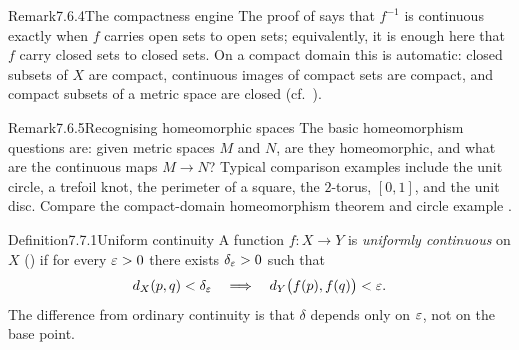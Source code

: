 \documentclass[main.tex]{subfiles}
\begin{document}
\begin{ObjL}{Remark}{7.6.4}{The compactness engine}
The proof of  says that $f^{-1}$ is continuous exactly when $f$ carries open sets to
open sets; equivalently, it is enough here that $f$ carry closed sets to closed sets. On a compact
domain this is automatic: closed subsets of $X$ are compact, continuous images of compact sets are
compact, and compact subsets of a metric space are closed (cf.\ ).
\end{ObjL}

\begin{ObjL}{Remark}{7.6.5}{Recognising homeomorphic spaces}
The basic homeomorphism questions are: given metric spaces $M$ and $N$, are they homeomorphic, and
what are the continuous maps $M\to N$? Typical comparison examples include the unit circle, a
trefoil knot, the perimeter of a square, the $2$-torus, $[0,1]$, and the unit disc. Compare the
compact-domain homeomorphism theorem  and circle example .
\end{ObjL}


\begin{Obj}{Definition}{7.7.1}{Uniform continuity}
A function $f:X\to Y$ is \emph{uniformly continuous} on $X$ () if for every $\varepsilon>0$ there exists
$\delta_\varepsilon>0$ such that
\[
  d_X(p,q)<\delta_\varepsilon
  \quad\Longrightarrow\quad
  d_Y\bigl(f(p),f(q)\bigr)<\varepsilon .
\]
The difference from ordinary continuity is that $\delta$ depends only on $\varepsilon$, not on the base
point.
\end{Obj}
\end{document}
